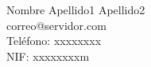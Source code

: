 Nombre Apellido1 Apellido2 \\ %
correo@servidor.com \\ %
Teléfono: xxxxxxxx \\ %
NIF: xxxxxxxxm \\ %
